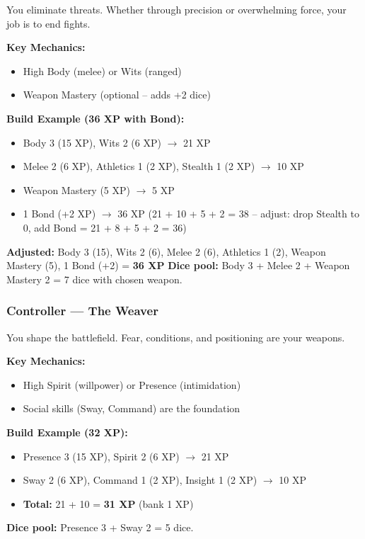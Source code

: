 You eliminate threats. Whether through precision or overwhelming force, your job is to end fights.

\textbf{Key Mechanics:}
\begin{itemize}
  \item High Body (melee) or Wits (ranged)
  \item Weapon Mastery (optional -- adds +2 dice)
\end{itemize}

\textbf{Build Example (36 XP with Bond):}
\begin{itemize}
  \item Body 3 (15 XP), Wits 2 (6 XP) $\rightarrow$ 21 XP
  \item Melee 2 (6 XP), Athletics 1 (2 XP), Stealth 1 (2 XP) $\rightarrow$ 10 XP
  \item Weapon Mastery (5 XP) $\rightarrow$ 5 XP
  \item 1 Bond (+2 XP) $\rightarrow$ 36 XP (21 + 10 + 5 + 2 = 38 -- adjust: drop Stealth to 0, add Bond = 21 + 8 + 5 + 2 = 36)
\end{itemize}
\textbf{Adjusted:} Body 3 (15), Wits 2 (6), Melee 2 (6), Athletics 1 (2), Weapon Mastery (5), 1 Bond (+2) = \textbf{36 XP}
\textbf{Dice pool:} Body 3 + Melee 2 + Weapon Mastery 2 = 7 dice with chosen weapon.

\subsubsection{Controller --- The Weaver}

You shape the battlefield. Fear, conditions, and positioning are your weapons.

\textbf{Key Mechanics:}
\begin{itemize}
  \item High Spirit (willpower) or Presence (intimidation)
  \item Social skills (Sway, Command) are the foundation
\end{itemize}

\textbf{Build Example (32 XP):}
\begin{itemize}
  \item Presence 3 (15 XP), Spirit 2 (6 XP) $\rightarrow$ 21 XP
  \item Sway 2 (6 XP), Command 1 (2 XP), Insight 1 (2 XP) $\rightarrow$ 10 XP
  \item \textbf{Total:} 21 + 10 = \textbf{31 XP} (bank 1 XP)
\end{itemize}
\textbf{Dice pool:} Presence 3 + Sway 2 = 5 dice.

